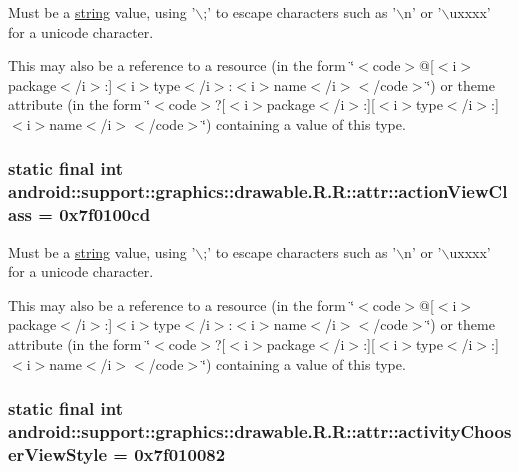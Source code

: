 Must be a \hyperlink{classandroid_1_1support_1_1graphics_1_1drawable_1_1_r_1_1string}{string} value, using '$\backslash$;' to escape characters such as '$\backslash$n' or '$\backslash$uxxxx' for a unicode character. 

This may also be a reference to a resource (in the form \char`\"{}$<$code$>$@\mbox{[}$<$i$>$package$<$/i$>$:\mbox{]}$<$i$>$type$<$/i$>$:$<$i$>$name$<$/i$>$$<$/code$>$\char`\"{}) or theme attribute (in the form \char`\"{}$<$code$>$?\mbox{[}$<$i$>$package$<$/i$>$:\mbox{]}\mbox{[}$<$i$>$type$<$/i$>$:\mbox{]}$<$i$>$name$<$/i$>$$<$/code$>$\char`\"{}) containing a value of this type. \hypertarget{classandroid_1_1support_1_1graphics_1_1drawable_1_1_r_1_1attr_44a3d30c933cd2fced3c5c2447b1e5ef}{
\subsubsection[{actionViewClass}]{\setlength{\rightskip}{0pt plus 5cm}static final int android::support::graphics::drawable.R.R::attr::actionViewClass = 0x7f0100cd}}
\label{classandroid_1_1support_1_1graphics_1_1drawable_1_1_r_1_1attr_44a3d30c933cd2fced3c5c2447b1e5ef}


Must be a \hyperlink{classandroid_1_1support_1_1graphics_1_1drawable_1_1_r_1_1string}{string} value, using '$\backslash$;' to escape characters such as '$\backslash$n' or '$\backslash$uxxxx' for a unicode character. 

This may also be a reference to a resource (in the form \char`\"{}$<$code$>$@\mbox{[}$<$i$>$package$<$/i$>$:\mbox{]}$<$i$>$type$<$/i$>$:$<$i$>$name$<$/i$>$$<$/code$>$\char`\"{}) or theme attribute (in the form \char`\"{}$<$code$>$?\mbox{[}$<$i$>$package$<$/i$>$:\mbox{]}\mbox{[}$<$i$>$type$<$/i$>$:\mbox{]}$<$i$>$name$<$/i$>$$<$/code$>$\char`\"{}) containing a value of this type. \hypertarget{classandroid_1_1support_1_1graphics_1_1drawable_1_1_r_1_1attr_aaff13fdf428f6845b760aab8efa521e}{
\subsubsection[{activityChooserViewStyle}]{\setlength{\rightskip}{0pt plus 5cm}static final int android::support::graphics::drawable.R.R::attr::activityChooserViewStyle = 0x7f010082}}
\label{classandroid_1_1support_1_1graphics_1_1drawable_1_1_r_1_1attr_aaff13fdf428f6845b760aab8efa521e}


